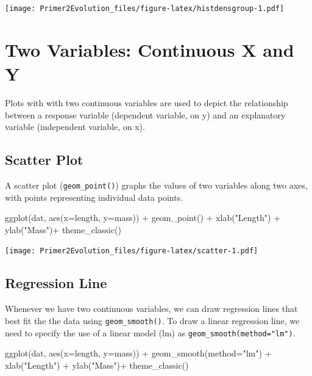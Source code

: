 \documentclass[
]{book}
\newenvironment{Shaded}{\begin{snugshade}}{\end{snugshade}}
\newcommand{\AttributeTok}[1]{\textcolor[rgb]{0.77,0.63,0.00}{#1}}
\newcommand{\FunctionTok}[1]{\textcolor[rgb]{0.00,0.00,0.00}{#1}}
\newcommand{\NormalTok}[1]{#1}
\newcommand{\SpecialCharTok}[1]{\textcolor[rgb]{0.00,0.00,0.00}{#1}}
\newcommand{\StringTok}[1]{\textcolor[rgb]{0.31,0.60,0.02}{#1}}
\begin{document}
\texttt{[image: Primer2Evolution\_files/figure-latex/histdensgroup-1.pdf]}

\hypertarget{two-variables-continuous-x-and-y}{%
\section{Two Variables: Continuous X and Y}\label{two-variables-continuous-x-and-y}}

Plots with with two continuous variables are used to depict the relationship between a response variable (dependent variable, on y) and an explanatory variable (independent variable, on x).

\hypertarget{scatter-plot}{%
\subsection{Scatter Plot}\label{scatter-plot}}

A scatter plot (\texttt{geom\_point()}) graphs the values of two variables along two axes, with points representing individual data points.

\begin{Shaded}
\begin{Highlighting}[]
\FunctionTok{ggplot}\NormalTok{(dat, }\FunctionTok{aes}\NormalTok{(}\AttributeTok{x=}\NormalTok{length, }\AttributeTok{y=}\NormalTok{mass)) }\SpecialCharTok{+}
    \FunctionTok{geom\_point}\NormalTok{() }\SpecialCharTok{+}
    \FunctionTok{xlab}\NormalTok{(}\StringTok{"Length"}\NormalTok{) }\SpecialCharTok{+}
    \FunctionTok{ylab}\NormalTok{(}\StringTok{"Mass"}\NormalTok{)}\SpecialCharTok{+}
    \FunctionTok{theme\_classic}\NormalTok{()}
\end{Highlighting}
\end{Shaded}

\texttt{[image: Primer2Evolution\_files/figure-latex/scatter-1.pdf]}

\hypertarget{regression-line}{%
\subsection{Regression Line}\label{regression-line}}

Whenever we have two continuous variables, we can draw regression lines that best fit the the data using \texttt{geom\_smooth()}. To draw a linear regression line, we need to specify the use of a linear model (lm) as \texttt{geom\_smooth(method="lm")}.

\begin{Shaded}
\begin{Highlighting}[]
\FunctionTok{ggplot}\NormalTok{(dat, }\FunctionTok{aes}\NormalTok{(}\AttributeTok{x=}\NormalTok{length, }\AttributeTok{y=}\NormalTok{mass)) }\SpecialCharTok{+}
    \FunctionTok{geom\_smooth}\NormalTok{(}\AttributeTok{method=}\StringTok{"lm"}\NormalTok{) }\SpecialCharTok{+}
    \FunctionTok{xlab}\NormalTok{(}\StringTok{"Length"}\NormalTok{) }\SpecialCharTok{+}
    \FunctionTok{ylab}\NormalTok{(}\StringTok{"Mass"}\NormalTok{)}\SpecialCharTok{+}
    \FunctionTok{theme\_classic}\NormalTok{()}
\end{Highlighting}
\end{Shaded}
\end{document}
